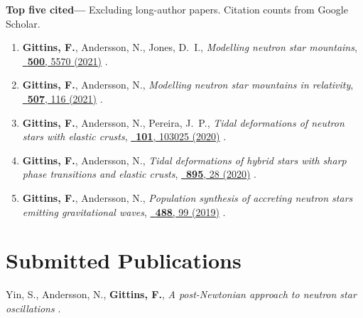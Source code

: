 \textbf{Top five cited---}%
Excluding long-author papers.
Citation counts from Google Scholar.
\begin{enumerate}
    \item \textbf{Gittins, F.}, Andersson, N., Jones, D.~I.,
    \textit{Modelling neutron star mountains},
    \href{https://doi.org/10.1093/mnras/staa3635}%
    {\mnras\ \textbf{500}, 5570 (2021)}
    .
    \item \textbf{Gittins, F.}, Andersson, N.,
    \textit{Modelling neutron star mountains in relativity},
    \href{https://doi.org/10.1093/mnras/stab2048}%
    {\mnras\ \textbf{507}, 116 (2021)}
    .
    \item \textbf{Gittins, F.}, Andersson, N., Pereira, J.~P.,
    \textit{Tidal deformations of neutron stars with elastic crusts},
    \href{https://doi.org/10.1103/PhysRevD.101.103025}%
    {\prd\ \textbf{101}, 103025 (2020)}
    .
    \item \textbf{Gittins, F.}, Andersson, N.,
    \textit{Tidal deformations of hybrid stars with sharp phase transitions and
    elastic crusts},
    \href{https://doi.org/10.3847/1538-4357/ab8aca}%
    {\apj\ \textbf{895}, 28 (2020)}
    .
    \item \textbf{Gittins, F.}, Andersson, N.,
    \textit{Population synthesis of accreting neutron stars emitting
    gravitational waves},
    \href{https://doi.org/10.1093/mnras/stz1719}%
    {\mnras\ \textbf{488}, 99 (2019)}
    .
\end{enumerate}
\else%
\fi

\renewcommand{\citeCount}[1]{}

\section{Submitted Publications}

\secstartswithlist{}%
\begin{etaremune}[start=\value{pubCounter}]
    \item Yin, S., Andersson, N., \textbf{Gittins, F.},
    \textit{A post-Newtonian approach to neutron star oscillations}
    .
    \citeCount{2}
%
    \setcounter{pubCounter}{\value{enumi}}
\end{etaremune}

